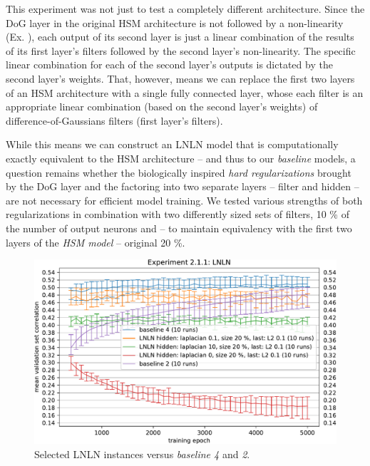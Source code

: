 This experiment was not just to test a completely different architecture. Since the DoG layer in the original HSM architecture is not followed by a non-linearity (Ex. ), each output of its second layer is just a linear combination of the results of its first layer’s filters followed by the second layer’s non-linearity. The specific linear combination for each of the second layer’s outputs is dictated by the second layer’s weights. That, however, means we can replace the first two layers of an HSM architecture with a single fully connected layer, whose each filter is an appropriate linear combination (based on the second layer’s weights) of difference-of-Gaussians filters (first layer’s filters). 

While this means we can construct an LNLN model that is computationally exactly equivalent to the HSM architecture -- and thus to our \textit{baseline} models, a question remains whether the biologically inspired \textit{hard regularizations} brought by the DoG layer and the factoring into two separate layers -- filter and hidden -- are not necessary for efficient model training. We tested various strengths of both regularizations in combination with two differently sized sets of filters, 10 \% of the number of output neurons and -- to maintain equivalency with the first two layers of the \textit{HSM model} -- original 20 \%.

\begin{figure}[H]
    \centering
    \includegraphics[width=1\textwidth]{../figures/05_2_1_1}
    \caption[Experiment 2.1.1]{Selected LNLN instances versus \textit{baseline 4} and \textit{2}.}
    \label{fig:5.2.1.1}
\end{figure}

